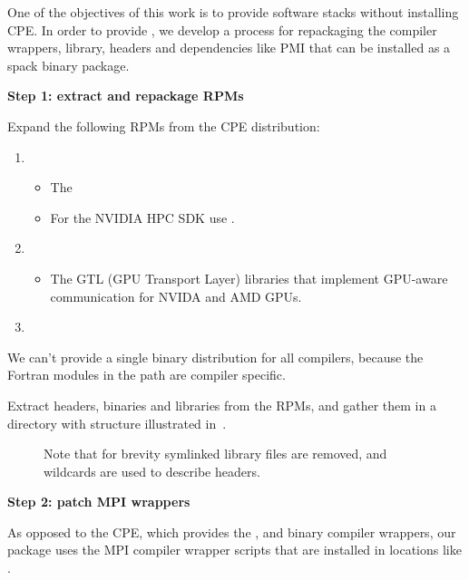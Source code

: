 One of the objectives of this work is to provide software stacks without installing CPE.
In order to provide \craympich, we develop a process for repackaging the compiler wrappers, library, headers and dependencies like PMI that can be installed as a spack binary package.

\noindent\textbf{Step 1: extract and repackage RPMs}

Expand the following RPMs from the CPE distribution:
\begin{enumerate}
    \item {}
    \begin{itemize}
        \item The \
        \item For the NVIDIA HPC SDK use .
    \end{itemize}
    \item {}
    \begin{itemize}
        \item The GTL (GPU Transport Layer) libraries that implement GPU-aware communication for NVIDA and AMD GPUs.
    \end{itemize}
    \item {}
\end{enumerate}

We can't provide a single binary distribution for all compilers, because the Fortran modules in the  path are compiler specific.

Extract headers, binaries and libraries from the RPMs, and gather them in a directory with structure illustrated in~.

\begin{figure}[htp!]
    
    \caption{ Note that for brevity symlinked library files are removed, and wildcards are used to describe headers.}
    \label{fig:mpich-tree}
\end{figure}


\noindent\textbf{Step 2: patch MPI wrappers}

As opposed to the CPE, which provides the ,  and  binary compiler wrappers, our package uses the MPI compiler wrapper scripts that are installed in locations like .

